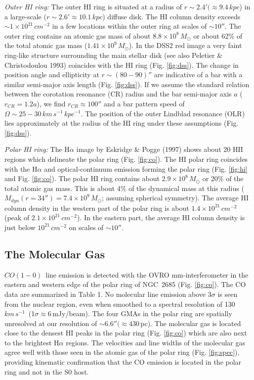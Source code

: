 \documentclass{aastex}
\newcommand{\COe}{$CO(1-0)$}
\newcommand{\kms}{km\,s^{-1}}
\newcommand{\cms}{cm^{-2}}
\newcommand{\solm}{M_{\odot}}
\begin{document}
{\it Outer HI ring:} The outer HI ring is situated at a radius of
$r\sim 2.4' (\approx 9.4\,kpc$) in a large-scale ($r \sim 2.6' \approx
10.1\,kpc$) diffuse disk.  The HI column density exceeds $\sim
1\times10^{21}\,\cms$ in a few locations within the outer ring at
scales of $\sim 10''$. The outer ring contains an atomic gas mass of
about $8.8\times10^8\,\solm$ or about 62\% of the total atomic gas
mass ($1.41\times10^9\,\solm$).  In the DSS2 red image a very faint
ring-like structure surrounding the main stellar disk (see also
Peletier \& Christodoulou 1993) coincides with the HI ring
(Fig. \ref{fig:dss}). The change in position angle and ellipticity at
$r\sim(80-90)''$ are indicative of a bar with a similar semi-major
axis length (Fig. \ref{fig:dss}). If we assume the standard relation
between the corotation resonance (CR) radius and the bar semi-major
axis $a$ ($r_{CR}=1.2a$), we find $r_{CR}\approx100''$ and a bar
pattern speed of $\Omega \sim 25 - 30\,\kms\,kpc^{-1}$. The position
of the outer Lindblad resonance (OLR) lies approximately at the radius
of the HI ring under these assumptions (Fig. \ref{fig:dss}).

{\it Polar HI ring:} The H$\alpha$ image by Eskridge \& Pogge (1997)
shows about 20 HII regions which delineate the polar ring
(Fig. \ref{fig:co}).  The HI polar ring coincides with the H$\alpha$
and optical-continuum emission forming the polar ring
(Fig. \ref{fig:hi} and Fig. \ref{fig:co}). The polar HI ring contains
about $2.9\times10^8\,\solm$ or 20\% of the total atomic gas
mass. This is about 4\% of the dynamical mass at this radius
($M_{dyn}(r=34'')=7.4\times10^9\,M_{\odot}$; assuming spherical
symmetry). The average HI column density in the western part of the
polar ring is about $1.4\times10^{21}\,cm^{-2}$ (peak of
$2.1\times10^{21}\,cm^{-2}$). In the eastern part, the average HI
column density is just below $10^{21}\,cm^{-2}$ on scales of $\sim
10''$.

\subsection{The Molecular Gas}

\COe\ line emission is detected with the OVRO mm-interferometer in the 
eastern and western edge of the polar ring of NGC~2685
(Fig. \ref{fig:co}). The CO data are summarized in Table
1. No molecular line emission above 3$\sigma$ is seen from the nuclear
region, even when smoothed to a spectral resolution of 130\,$\kms$\
(1$\sigma\approx$6\,mJy/beam). The four GMAs in the polar ring are
spatially unresolved at our resolution of $\sim 6.6'' (\approx
430$\,pc). The molecular gas is located close to the densest HI peaks
in the polar ring (Fig. \ref{fig:co}) which are also next to the
brightest H$\alpha$ regions. The velocities and line widths of the
molecular gas agree well with those seen in the atomic gas of the
polar ring (Fig. \ref{fig:spec}), providing kinematic
confirmation that the CO emission is located in the polar ring and
not in the S0 host.
\end{document}
